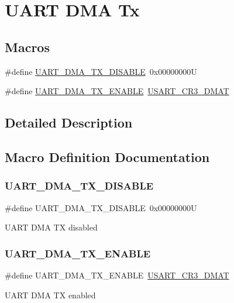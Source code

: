 \hypertarget{group___u_a_r_t___d_m_a___tx}{}\section{U\+A\+RT D\+MA Tx}
\label{group___u_a_r_t___d_m_a___tx}
\subsection*{Macros}
\begin{DoxyCompactItemize}
\item 
\#define \mbox{\hyperlink{group___u_a_r_t___d_m_a___tx_gaa318cc9c1aa55acc5bb93f378ac7d8e4}{U\+A\+R\+T\+\_\+\+D\+M\+A\+\_\+\+T\+X\+\_\+\+D\+I\+S\+A\+B\+LE}}~0x00000000U
\item 
\#define \mbox{\hyperlink{group___u_a_r_t___d_m_a___tx_gab1c3e8113617fb9c8fc63b3f3d7c8c65}{U\+A\+R\+T\+\_\+\+D\+M\+A\+\_\+\+T\+X\+\_\+\+E\+N\+A\+B\+LE}}~\mbox{\hyperlink{group___peripheral___registers___bits___definition_ga5bb515d3814d448f84e2c98bf44f3993}{U\+S\+A\+R\+T\+\_\+\+C\+R3\+\_\+\+D\+M\+AT}}
\end{DoxyCompactItemize}


\subsection{Detailed Description}


\subsection{Macro Definition Documentation}
\mbox{\label{group___u_a_r_t___d_m_a___tx_gaa318cc9c1aa55acc5bb93f378ac7d8e4}} 
\subsubsection{\texorpdfstring{UART\_DMA\_TX\_DISABLE}{UART\_DMA\_TX\_DISABLE}}
{\footnotesize\ttfamily \#define U\+A\+R\+T\+\_\+\+D\+M\+A\+\_\+\+T\+X\+\_\+\+D\+I\+S\+A\+B\+LE~0x00000000U}

U\+A\+RT D\+MA TX disabled \mbox{\label{group___u_a_r_t___d_m_a___tx_gab1c3e8113617fb9c8fc63b3f3d7c8c65}} 
\subsubsection{\texorpdfstring{UART\_DMA\_TX\_ENABLE}{UART\_DMA\_TX\_ENABLE}}
{\footnotesize\ttfamily \#define U\+A\+R\+T\+\_\+\+D\+M\+A\+\_\+\+T\+X\+\_\+\+E\+N\+A\+B\+LE~\mbox{\hyperlink{group___peripheral___registers___bits___definition_ga5bb515d3814d448f84e2c98bf44f3993}{U\+S\+A\+R\+T\+\_\+\+C\+R3\+\_\+\+D\+M\+AT}}}

U\+A\+RT D\+MA TX enabled 